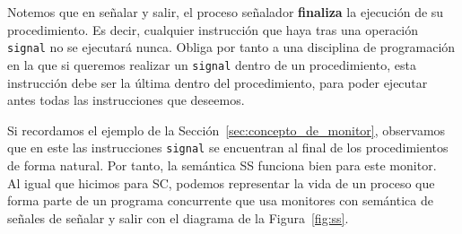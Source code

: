 Notemos que en señalar y salir, el proceso señalador \textbf{finaliza} la ejecución de su procedimiento. Es decir, cualquier instrucción que haya tras una operación \verb|signal| no se ejecutará nunca. Obliga por tanto a una disciplina de programación en la que si queremos realizar un \verb|signal| dentro de un procedimiento, esta instrucción debe ser la última dentro del procedimiento, para poder ejecutar antes todas las instrucciones que deseemos. 

Si recordamos el ejemplo de la Sección~\ref{sec:concepto_de_monitor}, observamos que en este las instrucciones \verb|signal| se encuentran al final de los procedimientos de forma natural. Por tanto, la semántica SS funciona bien para este monitor.\\

Al igual que hicimos para SC, podemos representar la vida de un proceso que forma parte de un programa concurrente que usa monitores con semántica de señales de señalar y salir con el diagrama de la Figura~\ref{fig:ss}.
